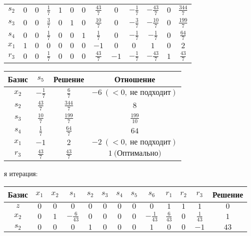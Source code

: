 \documentclass{article}%
\begin{document}
\begin{flushleft}
\begin{tabular}{|c|ccccccccccc|c|}
$s_{2}$&$0$&$0$&$\frac{1}{7}$&$1$&$0$&$0$&$\frac{43}{7}$&$0$&$-\frac{1}{7}$&$-\frac{43}{7}$&$0$&$\frac{344}{7}$\\%
$s_{3}$&$0$&$0$&$\frac{3}{7}$&$0$&$1$&$0$&$\frac{10}{7}$&$0$&$-\frac{3}{7}$&$-\frac{10}{7}$&$0$&$\frac{199}{7}$\\%
$s_{4}$&$0$&$0$&$\frac{1}{7}$&$0$&$0$&$1$&$\frac{1}{7}$&$0$&$-\frac{1}{7}$&$-\frac{1}{7}$&$0$&$\frac{64}{7}$\\%
$x_{1}$&$1$&$0$&$0$&$0$&$0$&$0$&$-1$&$0$&$0$&$1$&$0$&$2$\\%
$r_{3}$&$0$&$0$&$\frac{1}{7}$&$0$&$0$&$0$&$\frac{43}{7}$&$-1$&$-\frac{1}{7}$&$-\frac{43}{7}$&$1$&$\frac{43}{7}$\\%
\hline%
\end{tabular}%
\newline%
\newline%
\newline%
\begin{tabular}{|cccc|}%
\hline%
Базис&$s_{5}$&Решение&Отношение\\%
\hline%
$x_{2}$&$-\frac{1}{7}$&$\frac{6}{7}$&$-6\: (< 0, \: \text{не подходит})$\\%
$s_{2}$&$\frac{43}{7}$&$\frac{344}{7}$&$8$\\%
$s_{3}$&$\frac{10}{7}$&$\frac{199}{7}$&$\frac{199}{10}$\\%
$s_{4}$&$\frac{1}{7}$&$\frac{64}{7}$&$64$\\%
$x_{1}$&$-1$&$2$&$-2\: (< 0, \: \text{не подходит})$\\%
$r_{3}$&$\frac{43}{7}$&$\frac{43}{7}$&$1\: \text{(Оптимально)}$\\%
\hline%
\end{tabular}%
\newline%
\newline%
я итерация: %
\newline%
\newline%
\renewcommand{\arraystretch}{1.3}%
\begin{tabular}{|c|ccccccccccc|c|}%
\hline%
Базис&$x_{1}$&$x_{2}$&$s_{1}$&$s_{2}$&$s_{3}$&$s_{4}$&$s_{5}$&$s_{6}$&$r_{1}$&$r_{2}$&$r_{3}$&Решение\\%
\hline%
$z$&$0$&$0$&$0$&$0$&$0$&$0$&$0$&$0$&$1$&$1$&$1$&$0$\\%
\hline%
$x_{2}$&$0$&$1$&$-\frac{6}{43}$&$0$&$0$&$0$&$0$&$-\frac{1}{43}$&$\frac{6}{43}$&$0$&$\frac{1}{43}$&$1$\\%
$s_{2}$&$0$&$0$&$0$&$1$&$0$&$0$&$0$&$1$&$0$&$0$&$-1$&$43$\\%

\end{tabular}
\end{flushleft}
\end{document}
